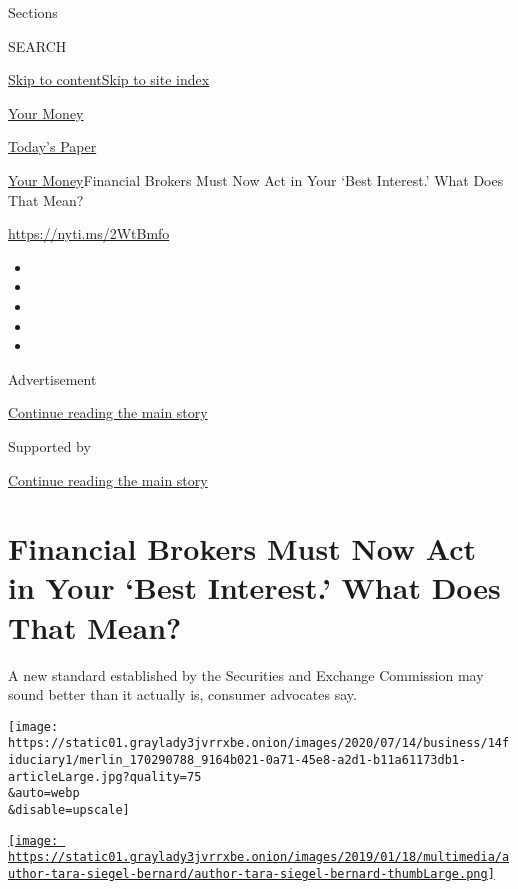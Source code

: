 Sections

SEARCH

\protect\hyperlink{site-content}{Skip to
content}\protect\hyperlink{site-index}{Skip to site index}

\href{https://www.nytimes3xbfgragh.onion/section/your-money}{Your Money}

\href{https://myaccount.nytimes3xbfgragh.onion/auth/login?response_type=cookie\&client_id=vi}{}

\href{https://www.nytimes3xbfgragh.onion/section/todayspaper}{Today's
Paper}

\href{/section/your-money}{Your Money}\textbar{}Financial Brokers Must
Now Act in Your `Best Interest.' What Does That Mean?

\url{https://nyti.ms/2WtBmfo}

\begin{itemize}
\item
\item
\item
\item
\item
\end{itemize}

Advertisement

\protect\hyperlink{after-top}{Continue reading the main story}

Supported by

\protect\hyperlink{after-sponsor}{Continue reading the main story}

\hypertarget{financial-brokers-must-now-act-in-your-best-interest-what-does-that-mean}{%
\section{Financial Brokers Must Now Act in Your `Best Interest.' What
Does That
Mean?}\label{financial-brokers-must-now-act-in-your-best-interest-what-does-that-mean}}

A new standard established by the Securities and Exchange Commission may
sound better than it actually is, consumer advocates say.

\texttt{[image: https://static01.graylady3jvrrxbe.onion/images/2020/07/14/business/14fiduciary1/merlin\_170290788\_9164b021-0a71-45e8-a2d1-b11a61173db1-articleLarge.jpg?quality=75\\\&auto=webp\\\&disable=upscale]}

\href{https://www.nytimes3xbfgragh.onion/by/tara-siegel-bernard}{\texttt{[image: https://static01.graylady3jvrrxbe.onion/images/2019/01/18/multimedia/author-tara-siegel-bernard/author-tara-siegel-bernard-thumbLarge.png]}}

